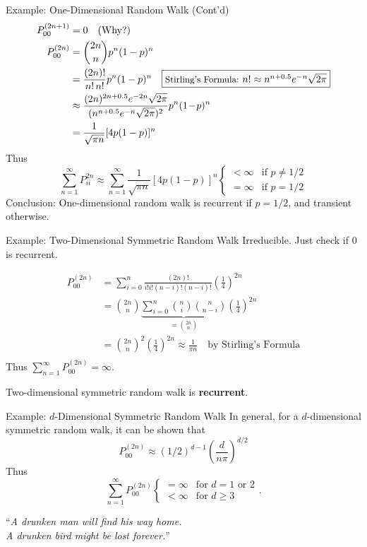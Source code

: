 \documentclass[letterpaper, mathserif]{beamer}
\begin{document}
\begin{frame}{Example: One-Dimensional Random Walk (Cont'd)}
\begin{align*}
P^{(2n+1)}_{00}&=0 \quad\text{(Why?)}\\
P^{(2n)}_{00}&={2n\choose n}p^n(1-p)^n \\
&=\frac{(2n)!}{n!\,n!}p^n(1-p)^n \quad\fbox{\text{\small Stirling's Formula:} $n!\approx n^{n+0.5}e^{-n}\sqrt{2\pi}$}\\
&\approx \frac{(2n)^{2n+0.5}e^{-2n}\sqrt{2\pi}}{(n^{n+0.5}e^{-n}\sqrt{2\pi})^2}p^n(1\!-\!p)^n\\
&=\frac{1}{\sqrt{\pi n}}[4p(1-p)]^n
\end{align*}
Thus
$$
\sum_{n=1}^{\infty}P^{2n}_{ii}\approx\sum_{n=1}^{\infty}\frac{1}{\sqrt{\pi n}}[4p(1-p)]^n
\begin{cases}
< \infty & \text{if }p\neq 1/2\\
= \infty & \text{if }p= 1/2
\end{cases}
$$
Conclusion: One-dimensional random walk is recurrent if $p=1/2$, and transient otherwise.
\end{frame}
\begin{frame}{Example: Two-Dimensional Symmetric Random Walk}
Irreducible. Just check if 0 is recurrent.

\begin{align*}
P^{(2n)}_{00}
&=\sum_{i=0}^{n}\frac{(2n)!}{i!i!(n-i)!(n-i)!}\left(\frac{1}{4}\right)^{2n}\\
&={2n\choose n}\underbrace{\sum_{i=0}^{n}{n\choose i}{n\choose n-i}}_{={2n\choose n}}\left(\frac{1}{4}\right)^{2n}\\
&={2n\choose n}^2\left(\frac{1}{4}\right)^{2n}\approx\frac{1}{\pi n}\quad\text{by Stirling's Formula}\\
\end{align*}
Thus $\sum_{n=1}^{\infty}P^{(2n)}_{00}=\infty$.\medskip

Two-dimensional symmetric random walk is {\bf recurrent}.
\end{frame}
\begin{frame}{Example: $d$-Dimensional Symmetric Random Walk}
In general, for a $d$-dimensional symmetric random walk, it can be shown that
$$
P^{(2n)}_{00}\approx(1/2)^{d-1}\left(\frac{d}{n\pi}\right)^{d/2}
$$
Thus
$$\sum_{n=1}^{\infty}P^{(2n)}_{00}\begin{cases}
= \infty & \text{for }d= 1\text{ or }2\\
< \infty & \text{for }d\ge 3
\end{cases}.
$$
\bigskip

\begin{center}
``{\em A drunken man will find his way home.\\
\quad A drunken bird might be lost forever.}''
\end{center}
\end{frame}
\end{document}
